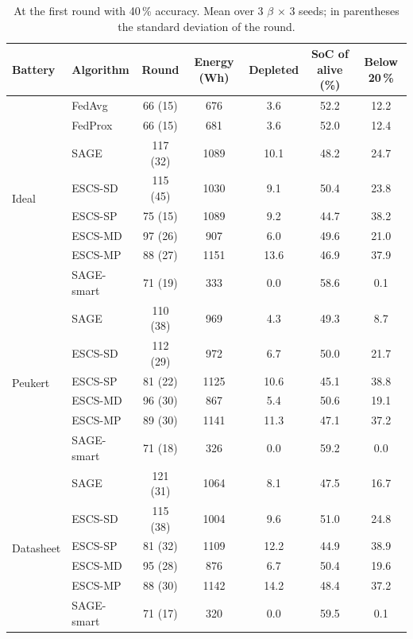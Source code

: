 \documentclass[11pt,a4paper]{article}
\begin{document}
\begin{table}[H]
  \centering
  \caption{At the first round with 40\,\% accuracy. Mean over 3 $\beta$
  $\times$ 3 seeds; in parentheses the standard deviation of the round.}
  \label{tab:thr}
  \begin{tabular}{llccccc}
    \toprule
    Battery & Algorithm & Round & Energy (Wh) & Depleted & SoC of alive (\%) & Below 20\,\% \\
    \midrule
    \multirow{8}{*}{Ideal}
      & FedAvg      & 66 (15)  & 676  & 3.6  & 52.2 & 12.2 \\
      & FedProx     & 66 (15)  & 681  & 3.6  & 52.0 & 12.4 \\
      & SAGE        & 117 (32) & 1089 & 10.1 & 48.2 & 24.7 \\
      & ESCS-SD     & 115 (45) & 1030 & 9.1  & 50.4 & 23.8 \\
      & ESCS-SP     & 75 (15)  & 1089 & 9.2  & 44.7 & 38.2 \\
      & ESCS-MD     & 97 (26)  & 907  & 6.0  & 49.6 & 21.0 \\
      & ESCS-MP     & 88 (27)  & 1151 & 13.6 & 46.9 & 37.9 \\
      & SAGE-smart  & 71 (19)  & 333  & 0.0  & 58.6 & 0.1  \\
    \midrule
    \multirow{6}{*}{Peukert}
      & SAGE        & 110 (38) & 969  & 4.3  & 49.3 & 8.7  \\
      & ESCS-SD     & 112 (29) & 972  & 6.7  & 50.0 & 21.7 \\
      & ESCS-SP     & 81 (22)  & 1125 & 10.6 & 45.1 & 38.8 \\
      & ESCS-MD     & 96 (30)  & 867  & 5.4  & 50.6 & 19.1 \\
      & ESCS-MP     & 89 (30)  & 1141 & 11.3 & 47.1 & 37.2 \\
      & SAGE-smart  & 71 (18)  & 326  & 0.0  & 59.2 & 0.0  \\
    \midrule
    \multirow{6}{*}{Datasheet}
      & SAGE        & 121 (31) & 1064 & 8.1  & 47.5 & 16.7 \\
      & ESCS-SD     & 115 (38) & 1004 & 9.6  & 51.0 & 24.8 \\
      & ESCS-SP     & 81 (32)  & 1109 & 12.2 & 44.9 & 38.9 \\
      & ESCS-MD     & 95 (28)  & 876  & 6.7  & 50.4 & 19.6 \\
      & ESCS-MP     & 88 (30)  & 1142 & 14.2 & 48.4 & 37.2 \\
      & SAGE-smart  & 71 (17)  & 320  & 0.0  & 59.5 & 0.1  \\
    \bottomrule
  \end{tabular}
\end{table}
\end{document}
